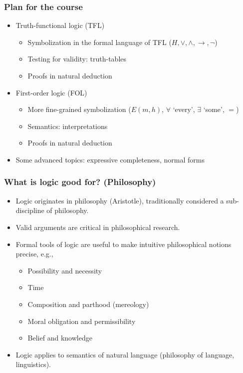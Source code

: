 \begin{frame}
  \frametitle{Plan for the course}

  \begin{itemize}[<+->]
  \item Truth-functional logic (TFL)
    \begin{itemize}[<+->]
    \item Symbolization in the formal language of TFL ($H, \lor,
    \land, \to, \lnot$)
    \item Testing for validity: truth-tables
    \item Proofs in natural deduction
    \end{itemize}
  \item First-order logic (FOL)
    \begin{itemize}[<+->]
    \item More fine-grained symbolization ($E(m,h)$, $\forall$
    `every', $\exists$ `some', $=$)
    \item Semantics: interpretations
    \item Proofs in natural deduction
    \end{itemize}
  \item Some advanced topics: expressive completeness, normal forms
  \end{itemize}
\end{frame}

\begin{frame}
  \frametitle{What is logic good for? (Philosophy)}

  \begin{itemize}[<+->]
  \item Logic originates in philosophy (Aristotle), traditionally considered a sub-discipline of philosophy.
  \item Valid arguments are critical in philosophical research.
  \item Formal tools of logic are useful to make intuitive philosophical
  notions precise, e.g.,
    \begin{itemize}[<+->]
    \item Possibility and necessity
    \item Time
    \item Composition and parthood (mereology)
    \item Moral obligation and permissibility
    \item Belief and knowledge
    \end{itemize}
  \item Logic applies to semantics of natural language (philosophy of
  language, linguistics).
  \end{itemize}
\end{frame}

